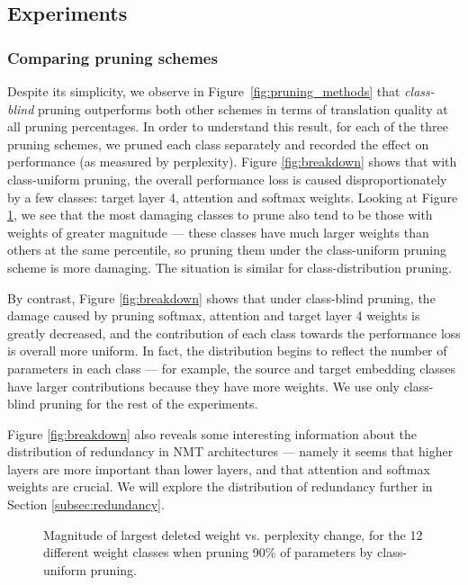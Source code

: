 \subsection{Experiments}
\label{subsec:exp}


\subsubsection{Comparing pruning schemes}
\label{subsubsec:exp_schemes}
Despite its simplicity, we observe in Figure~\ref{fig:pruning_methods} that {\it
class-blind} pruning outperforms both other schemes in terms of translation
quality at all pruning percentages.
In order to understand this result, for each of the three pruning schemes, we pruned each class separately and recorded the effect on performance (as measured by perplexity).
Figure \ref{fig:breakdown} shows that with class-uniform pruning, the overall performance loss is caused disproportionately by a few classes: target layer 4, attention and softmax weights. Looking at Figure \ref{fig:scatter}, we see that the most damaging classes to prune also tend to be those with weights of greater magnitude --- these classes have much larger weights than others at the same percentile, so pruning them under the class-uniform pruning scheme is more damaging. The situation is similar for class-distribution pruning.



By contrast, Figure \ref{fig:breakdown} shows that under class-blind pruning, the damage caused by pruning softmax, attention and target layer 4 weights is greatly decreased, and the contribution of each class towards the performance loss is overall more uniform.
In fact, the distribution begins to reflect the number of parameters in each class --- for example, the source and target embedding classes have larger contributions because they have more weights. 
We use only class-blind pruning for the rest of the experiments.

Figure \ref{fig:breakdown} also reveals some interesting information about the distribution of redundancy in NMT architectures --- namely it seems that higher layers are more important than lower layers, and that attention and softmax weights are crucial. We will explore the distribution of redundancy further in Section \ref{subsec:redundancy}.

\begin{figure}
\centering

\caption{Magnitude of largest deleted weight vs. perplexity change, for the 12 different weight classes when pruning 90\% of parameters by class-uniform pruning.}
\label{fig:scatter}
\end{figure}


